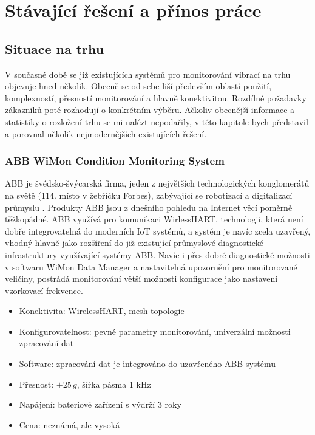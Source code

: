 \chapter{Stávající řešení a přínos práce}

\section{Situace na trhu}
    V současné době se již existujících systémů pro monitorování vibrací na trhu objevuje hned několik. Obecně se od sebe liší především oblastí použití, komplexností, přesností monitorování a hlavně konektivitou. Rozdílné požadavky zákazníků poté rozhodují o konkrétním výběru. Ačkoliv obecnější informace a statistiky o rozložení trhu se mi nalézt nepodařily, v této kapitole bych představil a porovnal několik nejmodernějších existujících řešení.  
    
    \subsection{ABB WiMon Condition Monitoring System}
        ABB je švédsko-švýcarská firma, jeden z největších technologických konglomerátů na světě (114. místo v žebříčku Forbes), zabývající se robotizací a digitalizací průmyslu \cite{manufactor:1}. Produkty ABB jsou z dnešního pohledu na Internet věcí poměrně těžkopádné. ABB využívá pro komunikaci WirlessHART, technologii, která není dobře integrovatelná do moderních IoT systémů, a systém je navíc zcela uzavřený, vhodný hlavně jako rozšíření do již existující průmyslové diagnostické infrastruktury využívající systémy ABB. Navíc i přes dobré diagnostické možnosti v softwaru WiMon Data Manager a nastavitelná upozornění pro monitorované veličiny, postrádá monitorování větší možnosti konfigurace jako nastavení vzorkovací frekvence.
        \begin{itemize}
            \item Konektivita: WirelessHART, mesh topologie
            \item Konfigurovatelnost: pevné parametry monitorování, univerzální možnosti zpracování dat
            \item Software: zpracování dat je integrováno do uzavřeného ABB systému
            \item Přesnost: $\pm 25\,g$, šířka pásma 1 kHz
            \item Napájení: bateriové zařízení s výdrží 3 roky
            \item Cena: neznámá, ale vysoká
        \end{itemize}{}
        
